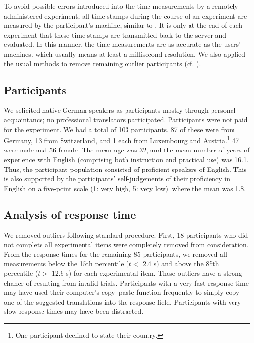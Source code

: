 \documentclass[output=paper]{LSP/langsci}
\begin{document}
To avoid possible errors introduced into the time measurements by a
remotely administered experiment, all time stamps during the course of
an experiment are measured by the participant's machine, similar to
\cite{keller09:_timin_accur_of_web_exper}. It is only at the end of
each experiment that these time stamps are transmitted back to the
server and evaluated. In this manner, the time measurements are as
accurate as the users' machines, which usually means at least a
millisecond resolution. We also applied the usual methods to remove
remaining outlier participants (cf. ).

\subsection{Participants}

We solicited native German speakers as participants mostly through
personal acquaintance; no professional translators
participated. Participants were not paid for the experiment. We had a
total of 103 participants. 87 of these were from Germany, 13 from
Switzerland, and 1 each from Luxembourg and Austria.\footnote{One
  participant declined to state their country.} 47 were male and 56
female. The mean age was 32, and the mean number of years of
experience with English (comprising both instruction and practical
use) was 16.1. Thus, the participant population consisted of
proficient speakers of English. This is also supported by the
participants' self-judgements of their proficiency in English on a
five-point scale (1: very high, 5: very low), where the mean was 1.8.

\subsection{Analysis of response time}
\label{sec:kremer:analys-react-times}

We removed outliers following standard procedure. First, 18 participants who did not
complete all experimental items were completely removed from consideration. From the response times for the
remaining 85 participants, we removed all measurements below the 15th
percentile ($t<$ 2.4 s) and above the 85th percentile ($t>$ 12.9 s)
for each experimental item. These outliers have a strong chance of
resulting from invalid trials. Participants with a very fast response
time may have used their computer's copy--paste function frequently to
simply copy one of the suggested translations into the response
field. Participants with very slow response times may have been
distracted.
\end{document}

